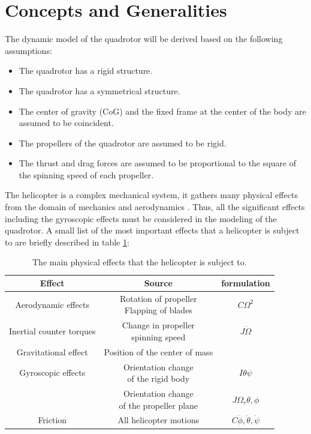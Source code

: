 \documentclass{thesisreport}
\begin{document}
\section{Concepts and Generalities}
The dynamic model of the quadrotor will be derived based on the following assumptions:

\begin{itemize}
	\item The quadrotor has a rigid structure.
	\item The quadrotor has a symmetrical structure.
	\item The center of gravity (CoG) and the fixed frame at the center of the body are assumed to be coincident.
	\item The propellers of the quadrotor are assumed to be rigid.
	\item The thrust and drag forces are assumed to be proportional to the square of the spinning speed of each propeller.
\end{itemize}
 
The helicopter is a complex mechanical system, it gathers many physical effects from the domain of mechanics and aerodynamics \cite{houston_2001}. Thus, all the significant effects including the gyroscopic effects must be considered in the modeling of the quadrotor. A small list of the most important effects that a helicopter is subject to \cite{Mullhaupt1999} are briefly described in table \ref{physical_effects}:

\begin{table}[h]
\caption{The main physical effects that the helicopter is subject to. }\label{physical_effects}
\centering
\setlength{\tabcolsep}{10pt} %
\renewcommand{\arraystretch}{1} %
\begin{tabular}{c c c}
\hline
\hline
Effect & Source & formulation \\
\hline
Aerodynamic effects & \shortstack{Rotation of propeller \\ Flapping of blades} & $C \Omega^2$\\
\hline
Inertial counter torques & \shortstack{Change in propeller \\ spinning speed} & $ J \dot{\Omega}$\\
Gravitational effect & Position of the center of mass & {} \\
\hline
Gyroscopic effects & \shortstack{Orientation change  \\ of the rigid body} & $ I \theta \psi$\\
 {} & \shortstack{Orientation change  \\ of the propeller plane} & $ J \Omega_r \theta,\phi$ \\
 \hline
Friction & All helicopter motions & $C \dot{\phi},\dot{\theta},\dot{\psi}$\\
\hline
\hline
\end{tabular}
\end{table}
\end{document}
